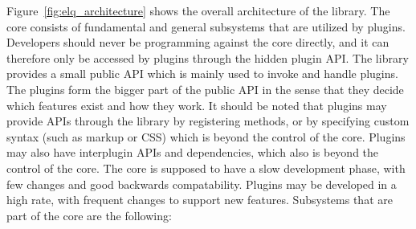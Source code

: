 \documentclass[a4paper,11pt]{kth-mag}
\begin{document}
      Figure~\ref{fig:elq_architecture} shows the overall architecture of the library.
      The core consists of fundamental and general subsystems that are utilized by plugins.
      Developers should never be programming against the core directly, and it can therefore only be accessed by plugins through the hidden plugin \gls{API}.
      The library provides a small public \gls{API} which is mainly used to invoke and handle plugins.
      The plugins form the bigger part of the public \gls{API} in the sense that they decide which features exist and how they work.
      It should be noted that plugins may provide \glspl{API} through the library by registering methods, or by specifying custom syntax (such as markup or \gls{CSS}) which is beyond the control of the core.
      Plugins may also have interplugin \glspl{API} and dependencies, which also is beyond the control of the core.
      The core is supposed to have a slow development phase, with few changes and good backwards compatability.
      Plugins may be developed in a high rate, with frequent changes to support new features.
      Subsystems that are part of the core are the following:
\end{document}
